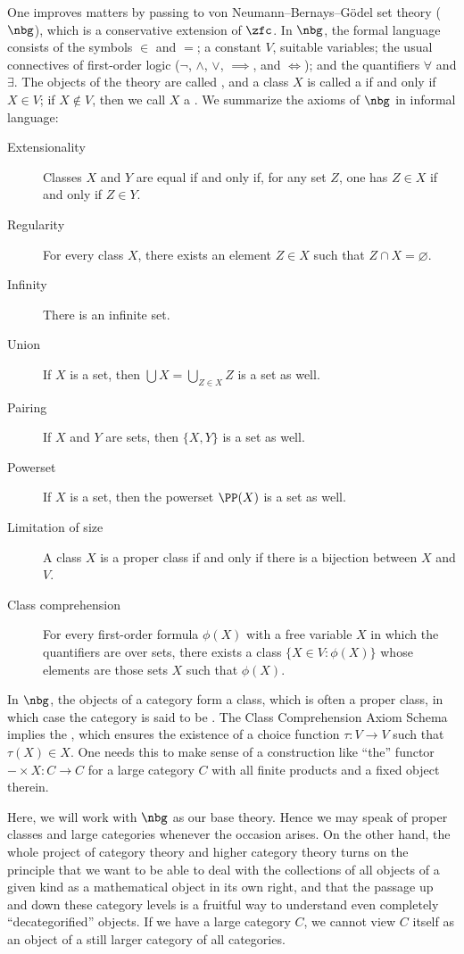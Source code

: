 One improves matters by passing to von Neumann--Bernays--Gödel set theory ($\nbg$), which is a conservative extension of $\zfc$.
In $ \nbg $, the formal language consists of the symbols $\in$ and $=$; a constant $V$, suitable variables; the usual connectives of first-order logic ($\neg$, $\wedge$, $\vee$, $\implies$, and $\iff$); and the quantifiers $\forall$ and $\exists$.
The objects of the theory are called , and a class $ X $ is called a  if and only if $X \in V$;
if $ X \notin V $, then we call $ X $ a .
We summarize the axioms of $ \nbg $ in informal language:
\begin{description}
	\item[Extensionality] Classes $ X $ and $ Y $ are equal if and only if, for any set $ Z $, one has $ Z \in X $ if and only if $ Z \in Y $.
	\item[Regularity] For every class $ X $, there exists an element $ Z \in X $ such that $ Z \cap X = \varnothing $.
	\item[Infinity] There is an infinite set.
	\item[Union] If $ X $ is a set, then $ \bigcup X = \bigcup_{Z \in X} Z $ is a set as well.
	\item[Pairing] If $X$ and $Y$ are sets, then $ \{X,Y\} $ is a set as well.
	\item[Powerset] If $ X $ is a set, then the powerset $ \PP(X) $ is a set as well.
	\item[Limitation of size] A class $X$ is a proper class if and only if there is a bijection between $X$ and $V$.
	\item[Class comprehension] For every first-order formula $ \phi(X) $ with a free variable $ X $ in which the quantifiers are over sets, there exists a class $ \{ X \in V : \phi(X) \} $ whose elements are those sets $ X $ such that $ \phi(X) $.
\end{description}

In $\nbg$, the objects of a category form a class, which is often a proper class, in which case the category is said to be .
The Class Comprehension Axiom Schema implies the ,
which ensures the existence of a choice function $ \tau \colon V \to V $ such that $ \tau(X) \in X $.
One needs this to make sense of a construction like \enquote{the} functor $ - \times X \colon C \to C $ for a large category $ C $ with all finite products and a fixed object therein.

Here, we will work with $\nbg$ as our base theory.
Hence we may speak of proper classes and large categories whenever the occasion arises.
On the other hand, the whole project of category theory and higher category theory turns on the principle that we want to be able to deal with the collections of all objects of a given kind as a mathematical object in its own right,
and that the passage up and down these category levels is a fruitful way to understand even completely \enquote{decategorified} objects.
If we have a large category $C$, we cannot view $C$ itself as an object of a still larger category of all categories.

